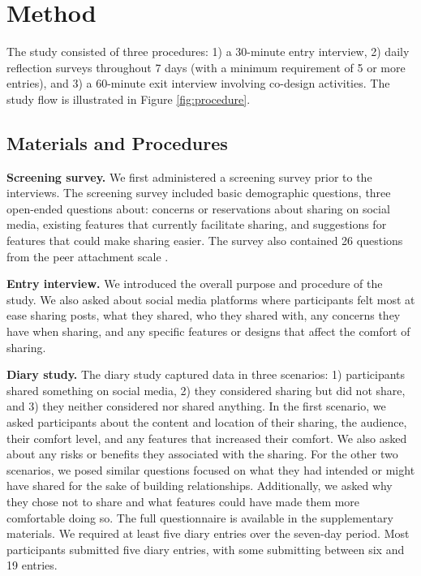 \section{Method}
The study consisted of three procedures: 1) a 30-minute entry interview, 2) daily reflection surveys throughout 7 days (with a minimum requirement of 5 or more entries), and 3) a 60-minute exit interview involving co-design activities. The study flow is illustrated in Figure \ref{fig:procedure}.



\subsection{Materials and Procedures}
\vspace{2mm}
\noindent\textbf{Screening survey.}
We first administered a screening survey prior to the interviews. The screening survey included basic demographic questions, three open-ended questions about: concerns or reservations about sharing on social media, existing features that currently facilitate sharing, and suggestions for features that could make sharing easier. The survey also contained 26 questions from the peer attachment scale \cite{Armsden1987-ai}.

\vspace{2mm}
\noindent\textbf{Entry interview.} We introduced the overall purpose and procedure of the study. We also asked about social media platforms where participants felt most at ease sharing posts, what they shared, who they shared with, any concerns they have when sharing, and any specific features or designs that affect the comfort of sharing.

\vspace{2mm}
\noindent\textbf{Diary study.} The diary study captured data in three scenarios: 1) participants shared something on social media, 2) they considered sharing but did not share, and 3) they neither considered nor shared anything. In the first scenario, we asked participants about the content and location of their sharing, the audience, their comfort level, and any features that increased their comfort. We also asked about any risks or benefits they associated with the sharing. For the other two scenarios, we posed similar questions focused on what they had intended or might have shared for the sake of building relationships. Additionally, we asked why they chose not to share and what features could have made them more comfortable doing so. The full questionnaire is available in the supplementary materials. We required at least five diary entries over the seven-day period. Most participants submitted five diary entries, with some submitting between six and 19 entries.

